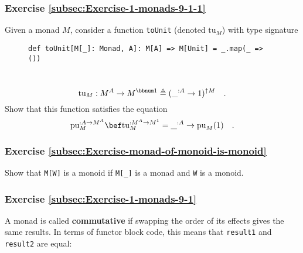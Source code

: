 \subsubsection{Exercise \label{subsec:Exercise-1-monads-9-1-1}\ref{subsec:Exercise-1-monads-9-1-1}}

Given a monad $M$, consider a function \lstinline!toUnit! (denoted
$\text{tu}_{M}$) with type signature

\begin{wrapfigure}{l}{0.61\columnwidth}%
\vspace{-0.5\baselineskip}
\begin{lstlisting}
def toUnit[M[_]: Monad, A]: M[A] => M[Unit] = _.map(_ => ())
\end{lstlisting}

\vspace{-0.5\baselineskip}
\end{wrapfigure}%

~\vspace{-0.9\baselineskip}
\[
\text{tu}_{M}:M^{A}\rightarrow M^{\bbnum 1}\triangleq(\_^{:A}\rightarrow1)^{\uparrow M}\quad.
\]
Show that this function satisfies the equation
\[
\text{pu}_{M}^{:A\rightarrow M^{A}}\bef\text{tu}_{M}^{:M^{A}\rightarrow M^{1}}=\_^{:A}\rightarrow\text{pu}_{M}(1)\quad.
\]


\subsubsection{Exercise \label{subsec:Exercise-monad-of-monoid-is-monoid}\ref{subsec:Exercise-monad-of-monoid-is-monoid}}

Show that \lstinline!M[W]! is a monoid if \lstinline!M[_]! is a
monad and \lstinline!W! is a monoid.

\subsubsection{Exercise \label{subsec:Exercise-1-monads-9-1}\ref{subsec:Exercise-1-monads-9-1}}

A monad is called \textbf{commutative}
if swapping the order of its effects gives the same results. In terms
of functor block code, this means that \lstinline!result1! and \lstinline!result2!
are equal:

